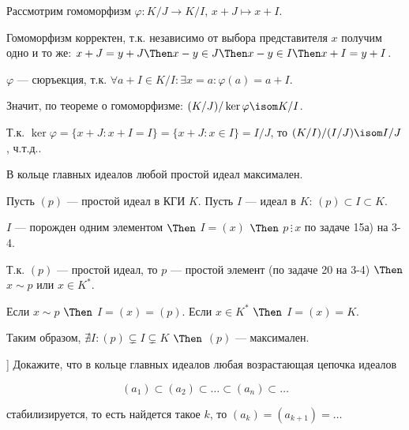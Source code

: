 \begin{solution}

Рассмотрим гомоморфизм $\varphi: K/J \to K/I$, $x + J \mapsto x + I$.

Гомоморфизм корректен, т.к. независимо от выбора представителя $x$ получим одно и то же: $x + J = y + J \Then x - y \in J \Then x - y \in I \Then x + I = y + I$.

$\varphi$ --- сюръекция, т.к. $\forall a + I \in K/I: \exists x = a: \varphi(a) = a + I$.

Значит, по теореме о гомоморфизме: $(K/J) / \ker \varphi \isom K/I$. 

Т.к. $\ker \varphi = \{x + J: x + I = I\}  = \{x + J: x \in I \} = I / J$, то $(K/I)/(I/J) \isom I/J$, ч.т.д..

\end{solution}


\begin{problem}[19 (4.9)]
	
В кольце главных идеалов любой простой идеал максимален.

\end{problem}

\begin{solution}
	
Пусть $(p)$ --- простой идеал в КГИ $K$. Пусть $I$ --- идеал в $K$: $(p) \subset I \subset K$.

$I$ --- порожден одним элементом $\Then$ $I = (x)$ $\Then$ $p \,\vdots\, x$ по задаче 15а) на 3-4.

Т.к. $(p)$ --- простой идеал, то $p$ --- простой элемент (по задаче 20 на 3-4) $\Then$ $x \sim p$ или $x \in K^*$.

Если $x \sim p$ $\Then$ $I = (x) = (p)$. Если $x \in K^*$ $\Then$ $I = (x) = K$.

Таким образом, $\nexists I: (p) \subsetneq I \subsetneq K$ $\Then$ $(p)$ --- максимален.
	
\end{solution}

\begin{problem}[25 [Каргальцев]]
Докажите, что в кольце главных идеалов любая возрастающая цепочка идеалов

$$ (a_1) \subset (a_2) \subset \ldots \subset (a_n) \subset \ldots $$

стабилизируется, то есть найдется такое $k$, то $(a_k) = (a_{k + 1}) = \ldots$
\end{problem}

